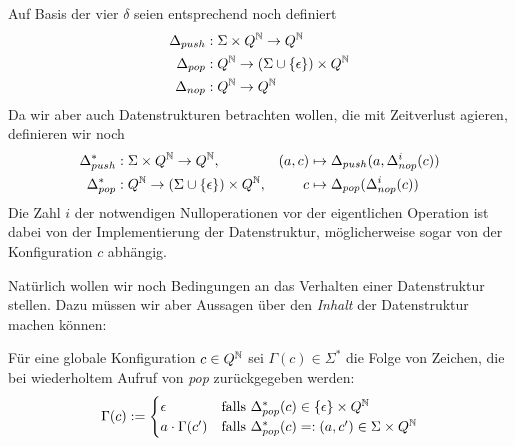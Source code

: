 \documentclass{article}
\begin{document}
Auf Basis der vier $\delta$ seien entsprechend noch definiert
\begin{align*}
    \Delta_{push} &: \Sigma \times Q^{\mathbb{N}} \rightarrow Q^{\mathbb{N}} \\
    \Delta_{pop} &: Q^{\mathbb{N}} \rightarrow (\Sigma \cup \{\epsilon\}) \times Q^{\mathbb{N}} \\
    \Delta_{nop} &: Q^{\mathbb{N}} \rightarrow Q^{\mathbb{N}}
\end{align*}
Da wir aber auch Datenstrukturen betrachten wollen, die mit Zeitverlust agieren, definieren wir noch
\begin{align*}
    \Delta^*_{push} &: \Sigma \times Q^{\mathbb{N}} \rightarrow Q^{\mathbb{N}},& (a,c) &\mapsto \Delta_{push}(a,\Delta^i_{nop}(c)) \\
    \Delta^*_{pop} &: Q^{\mathbb{N}} \rightarrow (\Sigma \cup \{\epsilon\}) \times Q^{\mathbb{N}},& c &\mapsto \Delta_{pop}(\Delta^i_{nop}(c))
\end{align*}
Die Zahl $i$ der notwendigen Nulloperationen vor der eigentlichen Operation ist dabei von der Implementierung der Datenstruktur, möglicherweise sogar von der Konfiguration $c$ abhängig.

Natürlich wollen wir noch Bedingungen an das Verhalten einer Datenstruktur stellen. Dazu müssen wir aber Aussagen über den \emph{Inhalt} der Datenstruktur machen können:
\begin{definition}
    Für eine globale Konfiguration $c \in Q^{\mathbb{N}}$ sei $\Gamma(c) \in \Sigma^*$ die Folge von Zeichen, die bei wiederholtem Aufruf von \emph{pop} zurückgegeben werden:
    \[ \Gamma(c) := \begin{cases}
            \epsilon &\text{falls } \Delta^*_{pop}(c) \in \{\epsilon\} \times Q^{\mathbb{N}} \\
        a \cdot \Gamma(c') &\text{falls }\Delta^*_{pop}(c)=:(a,c') \in \Sigma \times Q^{\mathbb{N}}
    \end{cases} \]
\end{definition}
\end{document}
